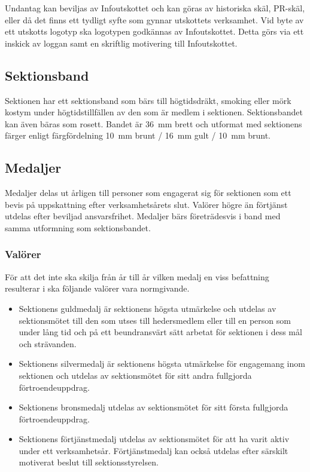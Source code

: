 \documentclass{datateknologsektionen-document}
\begin{document}
Undantag kan beviljas av Infoutskottet och kan göras av historiska skäl, PR-skäl, eller då det
finns ett tydligt syfte som gynnar utskottets verksamhet.
Vid byte av ett utskotts logotyp ska logotypen godkännas av Infoutskottet. Detta görs via ett inskick av
loggan samt en skriftlig motivering till Infoutskottet.


\subsection{Sektionsband}
Sektionen har ett sektionsband som bärs till högtidsdräkt, smoking eller mörk kostym
under högtidstillfällen av den som är medlem i sektionen. Sektionsbandet kan även
bäras som rosett. Bandet är 36~mm brett och utformat med sektionens färger enligt
färgfördelning 10~mm brunt / 16~mm gult / 10~mm brunt.

\subsection{Medaljer}
Medaljer delas ut årligen till personer som engagerat sig för sektionen som ett
bevis på uppskattning efter verksamhetsårets slut. Valörer högre än förtjänst
utdelas efter beviljad ansvarsfrihet. Medaljer bärs företrädesvis i band med samma
utformning som sektionsbandet.

\subsubsection{Valörer}
För att det inte ska skilja från år till år vilken medalj en viss befattning resulterar
i ska följande valörer vara normgivande.

\begin{itemize}
  \item Sektionens guldmedalj är sektionens högsta utmärkelse och utdelas av sektionsmötet
        till den som utses till hedersmedlem eller till en person som under lång tid och på
        ett beundransvärt sätt arbetat för sektionen i dess mål och strävanden.

  \item Sektionens silvermedalj är sektionens högsta utmärkelse för engagemang inom sektionen
        och utdelas av sektionsmötet för sitt andra fullgjorda förtroendeuppdrag.

  \item Sektionens bronsmedalj utdelas av sektionsmötet för sitt första fullgjorda förtroendeuppdrag.

  \item Sektionens förtjänstmedalj utdelas av sektionsmötet för att ha varit aktiv under ett verksamhetsår.
        Förtjänstmedalj kan också utdelas efter särskilt motiverat beslut till sektionsstyrelsen.
\end{itemize}
\end{document}

